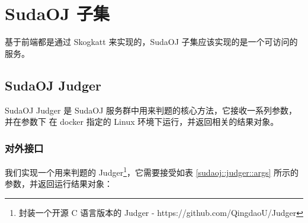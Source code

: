 
\section{SudaOJ 子集}
基于前端都是通过 Skogkatt 来实现的，SudaOJ 子集应该实现的是一个可访问的服务。

\subsection{SudaOJ Judger}

SudaOJ Judger 是 SudaOJ 服务群中用来判题的核心方法，它接收一系列参数，并在参数下
在 docker 指定的 Linux 环境下运行，并返回相关的结果对象。

\subsubsection{对外接口}
我们实现一个用来判题的 Judger\footnote{封装一个开源 C 语言版本的 Judger - %
https://github.com/QingdaoU/Judger}，它需要接受如表 \ref{sudaoj::judger::args} %
所示的参数，并返回运行结果对象：

